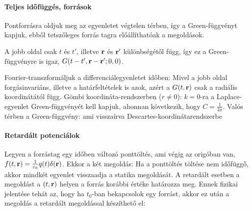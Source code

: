    \paragraph{Teljes időfüggés, források}
    
    Pontforrásra oldjuk meg az egyenletet végtelen térben, így a Green-függvényt kapjuk, ebből tetszőleges forrás tagra előállíthatóak a megoldások.
    
    A jobb oldal csak $t$ és $t'$, illetve $\mathbf{r}$ és $\mathbf{r}'$ különbségétől függ, így ez a Green-függvényre is igaz, $G(t-t',\mathbf{r}-\mathbf{r}';0,0)$.
    
    Fourier-transzformáljuk a differenciálegyenletet időben:
    Mivel a jobb oldal forgásinvariáns, illetve a határfeltételek is azok, azért a $G(t,\mathbf{r})$ csak a radiális koordinátától függ. Gömbi koordináta-rendszerben ($r\ne0$):
    $k=0$-ra a Laplace-egyenlet Green-függvényét kell kapjuk, ahonnan következik, hogy $C=\frac{1}{4\pi}$. Valós térben a Green-függvény:
    ami visszaírva Descartes-koordinátarendszerbe
    
    
   \paragraph{Retardált potenciálok}
    
    Legyen a forrástag egy időben változó ponttöltés, ami végig az origóban van, $f(t,\mathbf{r})=\frac{1}{\varepsilon_0}q(t)\delta(\mathbf{r})$. Ekkor a két megoldás:
    Ha a ponttöltés töltése nem időfüggő, akkor mindkét egyenlet visszaadja a statika megoldását. A retardált esetben a megoldást a $(t,\mathbf{r})$ helyen a forrás korábbi értéke határozza meg. Ennek fizikai jelentése tehát az, hogy ha $t_0$-ban bekapcsolok egy forrást, akkor ez után a megoldás a retardált megoldással készíthető el:
    
